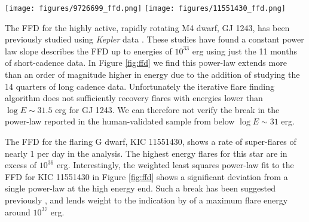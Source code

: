 \documentclass[twocolumn]{aastex6}
\newcommand{\Kepler}{\textsl{Kepler}\xspace}
\begin{document}
\begin{figure*}[!t]
\centering
\texttt{[image: figures/9726699\_ffd.png]}
\texttt{[image: figures/11551430\_ffd.png]}
\caption{
Left: Cumulative flare frequency diagram from all 14 long-cadence quarters (red lines) and 11 short-cadence months (blue lines) for the active M dwarf GJ 1243. The flare rate has been sampled using bins of logarithmic energy. Note the low-energy cutoff for each data file has been set to the average local 68\% flare recovery completeness limit. The average flare frequency distribution is computed by taking the mean in each bin for all files above their respective completeness limits (black line). Uncertainties shown are computed using the Poisson distribution. A weighted least squares power-law fit to the data is computed and fits the entire observed flare energy distribution (orange line).
Right: Same diagram for the flaring G dwarf KIC 11551430 (nicknamed ``Pearl'' by David R. Soderblom). %
Unlike GJ 1243, a break is apparent in the flare frequency distribution power-law at high energies.
}
\label{fig:ffd}
\end{figure*}

The FFD for the highly active, rapidly rotating M4 dwarf, GJ 1243, has been previously studied using \Kepler data \citep{ramsay2013,hawley2014,davenport2014b}. These studies have found a constant power law slope describes the FFD up to energies of $10^{33}$ erg using just the 11 months of short-cadence data. In Figure \ref{fig:ffd} we find this power-law extends more than an order of magnitude higher in energy due to the addition of studying the 14 quarters of long cadence data. Unfortunately the iterative flare finding algorithm does not sufficiently recovery flares with energies lower than $\log E \sim 31.5$ erg for GJ 1243. We can therefore not verify the break in the power-law reported in the human-validated sample from \citet{hawley2014} below $\log E \sim 31$ erg.


The FFD for the flaring G dwarf, KIC 11551430, shows a rate of super-flares of nearly 1 per day in the analysis. The highest energy flares for this star are in excess of $10^{36}$ erg. Interestingly, the weighted least squares power-law fit to the FFD for KIC 11551430 in Figure \ref{fig:ffd} shows a significant deviation from a single power-law at the high energy end. Such a break has been suggested previously \citep{chang2015, hudson2015}, and lends weight to the indication by \citet{wu2015} of a maximum flare energy around $10^{37}$ erg.
\end{document}
